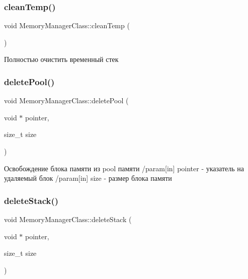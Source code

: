 \subsubsection{\texorpdfstring{clean\+Temp()}{cleanTemp()}}
{\footnotesize\ttfamily void Memory\+Manager\+Class\+::clean\+Temp (\begin{DoxyParamCaption}{ }\end{DoxyParamCaption})}



Полностью очистить временный стек 

\mbox{\label{class_memory_manager_class_a9252f2b77af1d7bab6ea14e27ab13764}} 
\subsubsection{\texorpdfstring{delete\+Pool()}{deletePool()}}
{\footnotesize\ttfamily void Memory\+Manager\+Class\+::delete\+Pool (\begin{DoxyParamCaption}\item[{void $\ast$}]{pointer,  }\item[{size\+\_\+t}]{size }\end{DoxyParamCaption})}



Освобождение блока памяти из pool памяти /param\mbox{[}in\mbox{]} pointer -\/ указатель на удаляемый блок /param\mbox{[}in\mbox{]} size -\/ размер блока памяти 

\mbox{\label{class_memory_manager_class_a0dbaebe8e574a7cff0242a5d93977abc}} 
\subsubsection{\texorpdfstring{delete\+Stack()}{deleteStack()}}
{\footnotesize\ttfamily void Memory\+Manager\+Class\+::delete\+Stack (\begin{DoxyParamCaption}\item[{void $\ast$}]{pointer,  }\item[{size\+\_\+t}]{size }\end{DoxyParamCaption})}




